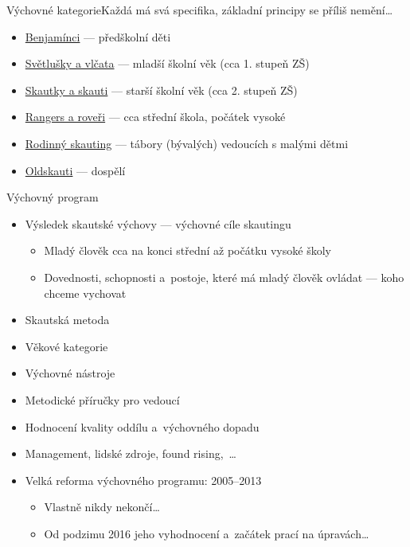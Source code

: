 \documentclass[compress, ucs, xelatex, xcolor=dvipsnames, print,
  hyperref={
    bookmarks=true,
    unicode=true,
    colorlinks=true,
    plainpages=false,
    pdfkeywords={Junak, Pedagogika, Skaut, Skauting, Vychovna metoda},
    linkcolor=Black,
    anchorcolor=Black,
    citecolor=OliveGreen,
    filecolor=OliveGreen,
    menucolor=Black,
    urlcolor=OliveGreen,
    pdftex}
  ]{beamer}
\begin{document}
\begin{frame}{Výchovné kategorie}{Každá má svá specifika, základní principy se příliš nemění\ldots}
  \begin{itemize}
    \item \href{https://krizovatka.skaut.cz/oddil/program/benjaminci}{Benjamínci} --- předškolní děti
    \item \href{https://krizovatka.skaut.cz/oddil/program/svetlusky-a-vlcata}{Světlušky a vlčata} --- mladší školní věk (cca 1. stupeň ZŠ)
    \item \href{https://krizovatka.skaut.cz/oddil/program/skautky-a-skauti}{Skautky a skauti} --- starší školní věk (cca 2. stupeň ZŠ)
    \item \href{https://krizovatka.skaut.cz/oddil/program/rangers-a-roveri}{Rangers a roveři} --- cca střední škola, počátek vysoké
    \item \href{https://krizovatka.skaut.cz/oddil/program/rodinny-skauting}{Rodinný skauting} --- tábory (bývalých) vedoucích s malými dětmi
    \item \href{https://krizovatka.skaut.cz/oddil/program/dospeli}{Oldskauti} --- dospělí
  \end{itemize}
\end{frame}

\begin{frame}{Výchovný program}
  \begin{itemize}
    \item Výsledek skautské výchovy --- výchovné cíle skautingu
    \begin{itemize}
      \item Mladý člověk cca na konci střední až počátku vysoké školy
      \item Dovednosti, schopnosti a~postoje, které má mladý člověk ovládat --- koho chceme vychovat
    \end{itemize}
    \item Skautská metoda
    \item Věkové kategorie
    \item Výchovné nástroje
    \item Metodické příručky pro vedoucí
    \item Hodnocení kvality oddílu a~výchovného dopadu
    \item Management, lidské zdroje, found rising,~\ldots
    \item Velká reforma výchovného programu: 2005--2013
    \begin{itemize}
      \item Vlastně nikdy nekončí\ldots
      \item Od podzimu 2016 jeho vyhodnocení a~začátek prací na úpravách\ldots
    \end{itemize}
  \end{itemize}
\end{frame}
\end{document}
